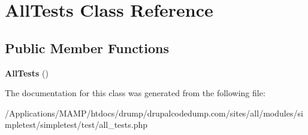 \hypertarget{class_all_tests}{
\section{AllTests Class Reference}
\label{class_all_tests}
}
\subsection*{Public Member Functions}
\begin{DoxyCompactItemize}
\item 
\hypertarget{class_all_tests_ae3e36ceb13b25dc8e8368b0b79cae2c4}{
{\bfseries AllTests} ()}
\label{class_all_tests_ae3e36ceb13b25dc8e8368b0b79cae2c4}

\end{DoxyCompactItemize}


The documentation for this class was generated from the following file:\begin{DoxyCompactItemize}
\item 
/Applications/MAMP/htdocs/drump/drupalcodedump.com/sites/all/modules/simpletest/simpletest/test/all\_\-tests.php\end{DoxyCompactItemize}
